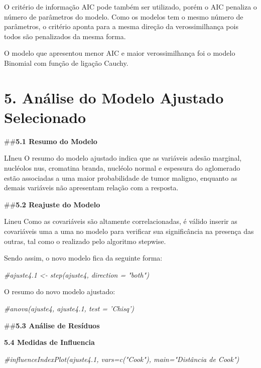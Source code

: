 \documentclass[]{article}
\newenvironment{Shaded}{\begin{snugshade}}{\end{snugshade}}
\newcommand{\CommentTok}[1]{\textcolor[rgb]{0.56,0.35,0.01}{\textit{#1}}}
\begin{document}
O critério de informação AIC pode também ser utilizado, porém o AIC
penaliza o número de parâmetros do modelo. Como os modelos tem o mesmo
número de parâmetros, o critério aponta para a mesma direção da
verossimilhança pois todos são penalizados da mesma forma.

O modelo que apresentou menor AIC e maior verossimilhança foi o modelo
Binomial com função de ligação Cauchy.

\hypertarget{analise-do-modelo-ajustado-selecionado}{%
\section{5. Análise do Modelo Ajustado
Selecionado}\label{analise-do-modelo-ajustado-selecionado}}

\#\#\textbf{5.1 Resumo do Modelo}

LIneu O resumo do modelo ajustado indica que as variáveis adesão
marginal, nucléolos nus, cromatina branda, nucléolo normal e espessura
do aglomerado estão associadas a uma maior probabilidade de tumor
maligno, enquanto as demais variáveis não apresentam relação com a
resposta.

\#\#\textbf{5.2 Reajuste do Modelo}

Lineu Como as covariáveis são altamente correlacionadas, é válido
inserir as covariáveis uma a uma no modelo para verificar sua
significância na presença das outras, tal como o realizado pelo
algoritmo stepwise.

Sendo assim, o novo modelo fica da seguinte forma:

\begin{Shaded}
\begin{Highlighting}[]
\CommentTok{#ajuste4.1 <- step(ajuste4, direction = "both")}
\end{Highlighting}
\end{Shaded}

O resumo do novo modelo ajustado:

\begin{Shaded}
\begin{Highlighting}[]
\CommentTok{#anova(ajuste4, ajuste4.1, test = 'Chisq')}
\end{Highlighting}
\end{Shaded}

\#\#\textbf{5.3 Análise de Resíduos}

\textbf{5.4 Medidas de Influencia}

\begin{Shaded}
\begin{Highlighting}[]
\CommentTok{#influenceIndexPlot(ajuste4.1, vars=c("Cook"), main="Distância de Cook")}
\end{Highlighting}
\end{Shaded}
\end{document}
